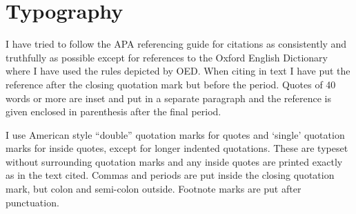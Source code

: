 \section{Typography}
\label{sec:typography}

I have tried to follow the APA referencing guide for citations as
consistently and truthfully as possible except for references to the
Oxford English Dictionary where I have used the rules depicted by OED.
When citing in text I have put the reference after the closing
quotation mark but before the period. Quotes of 40 words or more are
inset and put in a separate paragraph and the reference is given
enclosed in parenthesis after the final period.

I use American style ``double'' quotation marks for quotes and
`single' quotation marks for inside quotes, except for longer indented
quotations. These are typeset without surrounding quotation marks and
any inside quotes are printed exactly as in the text cited. Commas and
periods are put inside the closing quotation mark, but colon and
semi-colon outside. Footnote marks are put after punctuation.

